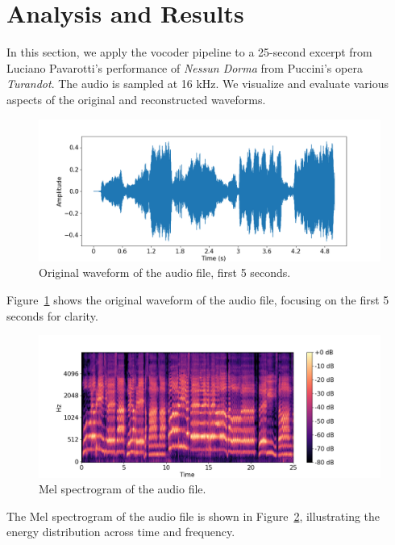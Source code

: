 \documentclass{article}
\begin{document}
\section{Analysis and Results}

In this section, we apply the vocoder pipeline to a 25-second excerpt from Luciano Pavarotti's performance of \textit{Nessun Dorma} from Puccini's opera \textit{Turandot}. The audio is sampled at 16 kHz. We visualize and evaluate various aspects of the original and reconstructed waveforms.

\begin{figure}[!htbp]
    \centering
    \includegraphics[width=\textwidth]{data/plots/nessun_dorma_trimmed_original_waveform.png}
    \caption{Original waveform of the audio file, first 5 seconds.}
    \label{fig:original_waveform}
\end{figure}

Figure~\ref{fig:original_waveform} shows the original waveform of the audio file, focusing on the first 5 seconds for clarity.

\begin{figure}[!htbp]
    \centering
    \includegraphics[width=\textwidth]{data/plots/nessun_dorma_trimmed_mel_spectrogram.png}
    \caption{Mel spectrogram of the audio file.}
    \label{fig:mel_spectrogram}
\end{figure}

The Mel spectrogram of the audio file is shown in Figure~\ref{fig:mel_spectrogram}, illustrating the energy distribution across time and frequency.
\end{document}
